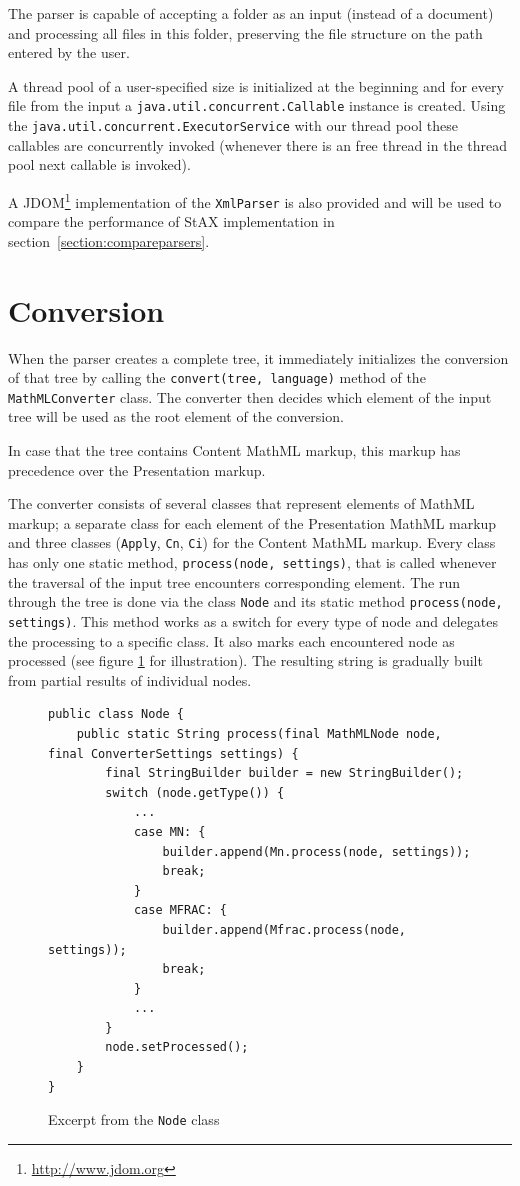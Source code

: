 \documentclass[11pt,oneside,final]{fithesis2}
\begin{document}
The parser is capable of accepting a folder as an input (instead of a document) and processing all files in this folder, preserving the file structure on the path entered by the user. 

A thread pool of a user-specified size is initialized at the beginning and for every file from the input a \texttt{java.util.concurrent.Callable} instance is created. Using the \texttt{java.util.concurrent.ExecutorService} with our thread pool these callables are concurrently invoked (whenever there is an free thread in the thread pool next callable is invoked). 

A JDOM\footnote{\url{http://www.jdom.org}} implementation of the \texttt{XmlParser} is also provided and will be used to compare the performance of StAX implementation in section~\ref{section:compareparsers}.

\section{Conversion}
When the parser creates a complete tree, it immediately initializes the conversion of that tree by calling the \texttt{convert(tree, language)} method of the \texttt{MathMLConverter} class. The converter then decides which element of the input tree will be used as the root element of the conversion. 

In case that the tree contains Content MathML markup, this markup has precedence over the Presentation markup. 

The converter consists of several classes that represent elements of MathML markup; a separate class for each element of the Presentation MathML markup and three classes (\texttt{Apply}, \texttt{Cn}, \texttt{Ci}) for the Content MathML markup. Every class has only one static method, \texttt{process(node, settings)}, that is called whenever the traversal of the input tree encounters corresponding element. The run through the tree is done via the class \texttt{Node} and its static method \texttt{process(node, settings)}. This method works as a switch for every type of node and delegates the processing to a specific class. It also marks each encountered node as processed (see figure \ref{fig:converter-node} for illustration). The resulting string is gradually built from partial results of individual nodes.

\begin{figure}[!ht]
\begin{lstlisting}
public class Node {
	public static String process(final MathMLNode node, final ConverterSettings settings) {
		final StringBuilder builder = new StringBuilder();
        switch (node.getType()) {
            ...
            case MN: {
                builder.append(Mn.process(node, settings));
                break;
            }
            case MFRAC: {    
                builder.append(Mfrac.process(node, settings));
                break;
            }
            ...
        }
        node.setProcessed();
    }    
}
\end{lstlisting}
\caption{Excerpt from the \texttt{Node} class}
\label{fig:converter-node}
\end{figure}
\end{document}
